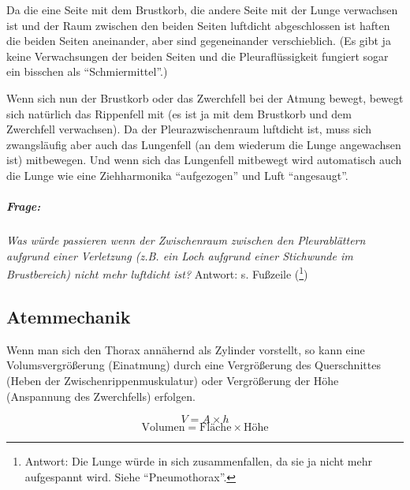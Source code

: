 Da die eine Seite mit dem Brustkorb, die andere Seite mit der Lunge
verwachsen ist und der Raum zwischen den beiden Seiten luftdicht
abgeschlossen ist haften die beiden Seiten aneinander, aber sind
gegeneinander verschieblich. (Es gibt ja keine
Verwachsungen der beiden Seiten und die Pleuraflüssigkeit fungiert sogar ein
bisschen als "`Schmiermittel"'.) 

Wenn sich nun der Brustkorb oder das Zwerchfell bei der
Atmung bewegt, bewegt sich natürlich das Rippenfell mit (es ist ja mit dem Brustkorb
und dem Zwerchfell verwachsen). Da der Pleurazwischenraum
luftdicht ist, muss sich zwangsläufig aber auch das Lungenfell (an dem
wiederum die Lunge angewachsen ist) mitbewegen. Und wenn sich das Lungenfell
mitbewegt wird automatisch auch die Lunge wie eine Ziehharmonika
"`aufgezogen"' und Luft
"`angesaugt"'. 

\subparagraph{Frage:} \emph{Was würde passieren wenn der
Zwischenraum zwischen den Pleurablättern aufgrund einer Verletzung (z.B. ein
Loch aufgrund einer Stichwunde im Brustbereich) nicht mehr luftdicht
ist?} Antwort: s. Fußzeile (\footnote{Antwort: Die Lunge
würde in sich zusammenfallen, da sie ja nicht mehr aufgespannt wird. Siehe
"`Pneumothorax"'. })



\subsection{Atemmechanik}
\label{topic:atemmechanik}  

Wenn man sich den Thorax annähernd als Zylinder vorstellt,
so kann eine Volumsvergrößerung (Einatmung) durch eine
Vergrößerung des Querschnittes (Heben der
Zwischenrippenmuskulatur)
oder Vergrößerung der Höhe (Anspannung des Zwerchfells) erfolgen.

\begin{equation}
V = A \times h
\end{equation}
\begin{equation}
\mbox{Volumen} = \mbox{Fläche} \times \mbox{Höhe}
\end{equation}


